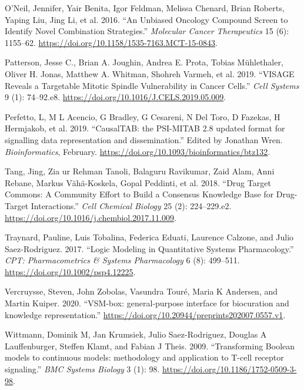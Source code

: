 \documentclass[
  12pt,
]{book}
\newlength{\cslhangindent}
\newenvironment{cslreferences}%
  {\setlength{\parindent}{0pt}%
  \everypar{\setlength{\hangindent}{\cslhangindent}}\ignorespaces}%
  {\par}
\begin{document}
\begin{cslreferences}
\leavevmode\hypertarget{ref-ONeil2016}{}%
O'Neil, Jennifer, Yair Benita, Igor Feldman, Melissa Chenard, Brian Roberts, Yaping Liu, Jing Li, et al. 2016. ``An Unbiased Oncology Compound Screen to Identify Novel Combination Strategies.'' \emph{Molecular Cancer Therapeutics} 15 (6): 1155--62. \url{https://doi.org/10.1158/1535-7163.MCT-15-0843}.

\leavevmode\hypertarget{ref-Patterson2019}{}%
Patterson, Jesse C., Brian A. Joughin, Andrea E. Prota, Tobias Mühlethaler, Oliver H. Jonas, Matthew A. Whitman, Shohreh Varmeh, et al. 2019. ``VISAGE Reveals a Targetable Mitotic Spindle Vulnerability in Cancer Cells.'' \emph{Cell Systems} 9 (1): 74--92.e8. \url{https://doi.org/10.1016/J.CELS.2019.05.009}.

\leavevmode\hypertarget{ref-Perfetto2019}{}%
Perfetto, L, M L Acencio, G Bradley, G Cesareni, N Del Toro, D Fazekas, H Hermjakob, et al. 2019. ``CausalTAB: the PSI-MITAB 2.8 updated format for signalling data representation and dissemination.'' Edited by Jonathan Wren. \emph{Bioinformatics}, February. \url{https://doi.org/10.1093/bioinformatics/btz132}.

\leavevmode\hypertarget{ref-Tang2018}{}%
Tang, Jing, Zia ur Rehman Tanoli, Balaguru Ravikumar, Zaid Alam, Anni Rebane, Markus Vähä-Koskela, Gopal Peddinti, et al. 2018. ``Drug Target Commons: A Community Effort to Build a Consensus Knowledge Base for Drug-Target Interactions.'' \emph{Cell Chemical Biology} 25 (2): 224--229.e2. \url{https://doi.org/10.1016/j.chembiol.2017.11.009}.

\leavevmode\hypertarget{ref-Traynard2017}{}%
Traynard, Pauline, Luis Tobalina, Federica Eduati, Laurence Calzone, and Julio Saez-Rodriguez. 2017. ``Logic Modeling in Quantitative Systems Pharmacology.'' \emph{CPT: Pharmacometrics \& Systems Pharmacology} 6 (8): 499--511. \url{https://doi.org/10.1002/psp4.12225}.

\leavevmode\hypertarget{ref-vercruysse2020vsm}{}%
Vercruysse, Steven, John Zobolas, Vasundra Touré, Maria K Andersen, and Martin Kuiper. 2020. ``VSM-box: general-purpose interface for biocuration and knowledge representation.'' \url{https://doi.org/10.20944/preprints202007.0557.v1}.

\leavevmode\hypertarget{ref-Wittmann2009}{}%
Wittmann, Dominik M, Jan Krumsiek, Julio Saez-Rodriguez, Douglas A Lauffenburger, Steffen Klamt, and Fabian J Theis. 2009. ``Transforming Boolean models to continuous models: methodology and application to T-cell receptor signaling.'' \emph{BMC Systems Biology} 3 (1): 98. \url{https://doi.org/10.1186/1752-0509-3-98}.


\end{cslreferences}
\end{document}
